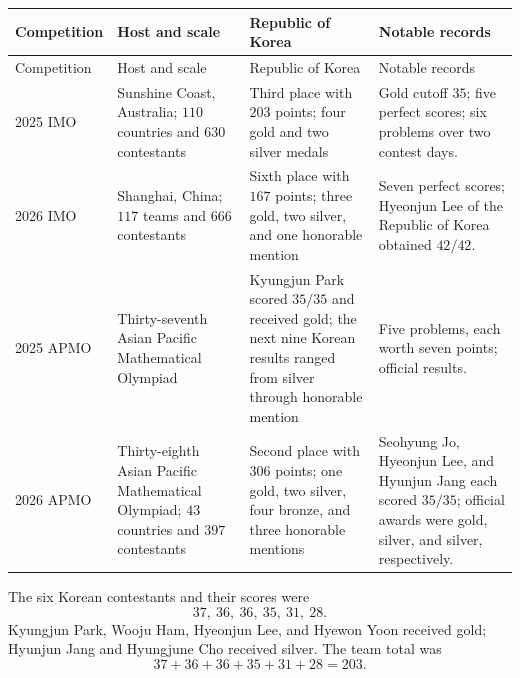     {\small
    \renewcommand{\arraystretch}{1.2}
    \begin{longtable}{@{}L{0.12\textwidth}L{0.21\textwidth}L{0.27\textwidth}L{0.32\textwidth}@{}}
        \toprule
        Competition & Host and scale & Republic of Korea & Notable records \\
        \midrule
        \endfirsthead

        \toprule
        Competition & Host and scale & Republic of Korea & Notable records \\
        \midrule
        \endhead

        \bottomrule
        \endlastfoot

        2025 IMO
        & Sunshine Coast, Australia; $110$ countries and $630$ contestants
        & Third place with $203$ points; four gold and two silver medals
        & Gold cutoff $35$; five perfect scores; six problems over two contest days. \\

        2026 IMO
        & Shanghai, China; $117$ teams and $666$ contestants
        & Sixth place with $167$ points; three gold, two silver, and one
          honorable mention
        & Seven perfect scores; Hyeonjun Lee of the Republic of Korea obtained $42/42$. \\

        2025 APMO
        & Thirty-seventh Asian Pacific Mathematical Olympiad
        & Kyungjun Park scored $35/35$ and received gold; the next nine Korean
          results ranged from silver through honorable mention
        & Five problems, each worth seven points; official results. \\

        2026 APMO
        & Thirty-eighth Asian Pacific Mathematical Olympiad; $43$ countries and
          $397$ contestants
        & Second place with $306$ points; one gold, two silver, four bronze, and
          three honorable mentions
        & Seohyung Jo, Hyeonjun Lee, and Hyunjun Jang each scored $35/35$;
          official awards were gold, silver, and silver, respectively. \\
    \end{longtable}
    }

    \begin{fact}
        The six Korean contestants and their scores were
        \[
            37,\ 36,\ 36,\ 35,\ 31,\ 28.
        \]
        Kyungjun Park, Wooju Ham, Hyeonjun Lee, and Hyewon Yoon received gold;
        Hyunjun Jang and Hyungjune Cho received silver. The team total was
        \[
            37+36+36+35+31+28=203.
        \]
    \end{fact}

